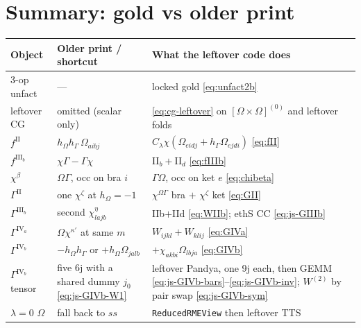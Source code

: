 \documentclass[enabledeprecatedfontcommands]{scrartcl}
\newcommand{\codename}[1]{\texttt{#1}}
\begin{document}
\section{Summary: gold vs older print}
\label{sec:summary}

\begin{center}
\begin{tabular}{@{}llp{}@{}}
\hline
Object & Older print / shortcut & What the leftover code does \\
\hline
3-op unfact & --- & locked gold \eqref{eq:unfact2b} \\
leftover CG & omitted (scalar only) & \eqref{eq:cg-leftover} on $[\Omega\times\Omega]^{(0)}$ and leftover folds \\
$f^{\mathrm{II}}$ & $h_\Omega h_\Gamma\,\Omega_{aibj}$ &
  $C_\lambda\chi(\Omega_{eidj}+h_\Gamma\Omega_{ejdi})$ \eqref{eq:fII} \\
$f^{\mathrm{III}_b}$ & $\chi\Gamma-\Gamma\chi$ & II$_b+$II$_d$ \eqref{eq:fIIIb} \\
$\chi^\beta$ & $\Omega\Gamma$, occ on bra $i$ & $\Gamma\Omega$, occ on ket $e$ \eqref{eq:chibeta} \\
$\Gamma^{\mathrm{II}}$ & one $\chi^\zeta$ at $h_\Omega=-1$ &
  $\chi^{\Omega\Gamma}$ bra $+$ $\chi^\zeta$ ket \eqref{eq:GII} \\
$\Gamma^{\mathrm{III}_b}$ & second $\chi^\eta_{lajb}$ &
  IIb$+$IId \eqref{eq:WIIb}; ethS CC \eqref{eq:js-GIIIb} \\
$\Gamma^{\mathrm{IV}_a}$ & $\Omega\chi^{\kappa'}$ at same $m$ &
  $W_{ijkl}+W_{klij}$ \eqref{eq:GIVa} \\
$\Gamma^{\mathrm{IV}_b}$ & $-h_\Omega h_\Gamma$ or $+h_\Omega\Omega_{jalb}$ &
  $+\chi_{akbi}\Omega_{lbja}$ \eqref{eq:GIVb} \\
$\Gamma^{\mathrm{IV}_b}$ tensor & five 6j with a shared dummy $j_0$
  \eqref{eq:js-GIVb-W1} &
  leftover Pandya, one 9j each, then GEMM
  \eqref{eq:js-GIVb-bars}--\eqref{eq:js-GIVb-inv};
  $W^{(2)}$ by pair swap \eqref{eq:js-GIVb-sym} \\
$\lambda=0$ $\Omega$ & fall back to $ss$ & \codename{ReducedRMEView} then leftover TTS \\
\hline
\end{tabular}
\end{center}
\end{document}
